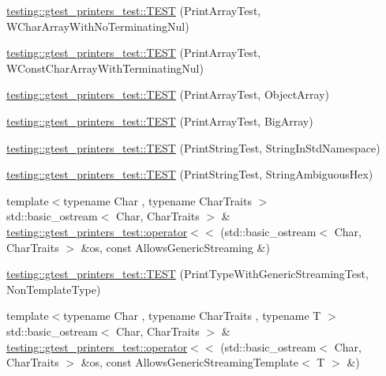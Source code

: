 \begin{DoxyCompactItemize}
\item 
\hyperlink{namespacetesting_1_1gtest__printers__test_ac19ec2732031bfe83b30ea9f00259ef3}{testing\+::gtest\+\_\+printers\+\_\+test\+::\+T\+E\+S\+T} (Print\+Array\+Test, W\+Char\+Array\+With\+No\+Terminating\+Nul)
\item 
\hyperlink{namespacetesting_1_1gtest__printers__test_a6a7cbcdbe748a1d4e90658f48f36c9da}{testing\+::gtest\+\_\+printers\+\_\+test\+::\+T\+E\+S\+T} (Print\+Array\+Test, W\+Const\+Char\+Array\+With\+Terminating\+Nul)
\item 
\hyperlink{namespacetesting_1_1gtest__printers__test_af91d8ad9d6c7547913fe05c7acc44114}{testing\+::gtest\+\_\+printers\+\_\+test\+::\+T\+E\+S\+T} (Print\+Array\+Test, Object\+Array)
\item 
\hyperlink{namespacetesting_1_1gtest__printers__test_a596493b56489aa1571fa26d1402e7116}{testing\+::gtest\+\_\+printers\+\_\+test\+::\+T\+E\+S\+T} (Print\+Array\+Test, Big\+Array)
\item 
\hyperlink{namespacetesting_1_1gtest__printers__test_abbd355e76033f0defd76c37523ad0f60}{testing\+::gtest\+\_\+printers\+\_\+test\+::\+T\+E\+S\+T} (Print\+String\+Test, String\+In\+Std\+Namespace)
\item 
\hyperlink{namespacetesting_1_1gtest__printers__test_ac20ee165500471e363011c3f664d2fb8}{testing\+::gtest\+\_\+printers\+\_\+test\+::\+T\+E\+S\+T} (Print\+String\+Test, String\+Ambiguous\+Hex)
\item 
{\footnotesize template$<$typename Char , typename Char\+Traits $>$ }\\std\+::basic\+\_\+ostream$<$ Char, Char\+Traits $>$ \& \hyperlink{namespacetesting_1_1gtest__printers__test_a1eb0213095e639d357692066e8505887}{testing\+::gtest\+\_\+printers\+\_\+test\+::operator$<$$<$} (std\+::basic\+\_\+ostream$<$ Char, Char\+Traits $>$ \&os, const Allows\+Generic\+Streaming \&)
\item 
\hyperlink{namespacetesting_1_1gtest__printers__test_a9272037c799c4779e1d79476dad66cb6}{testing\+::gtest\+\_\+printers\+\_\+test\+::\+T\+E\+S\+T} (Print\+Type\+With\+Generic\+Streaming\+Test, Non\+Template\+Type)
\item 
{\footnotesize template$<$typename Char , typename Char\+Traits , typename T $>$ }\\std\+::basic\+\_\+ostream$<$ Char, Char\+Traits $>$ \& \hyperlink{namespacetesting_1_1gtest__printers__test_a5464168e925b1adf29986c8e544e908e}{testing\+::gtest\+\_\+printers\+\_\+test\+::operator$<$$<$} (std\+::basic\+\_\+ostream$<$ Char, Char\+Traits $>$ \&os, const Allows\+Generic\+Streaming\+Template$<$ T $>$ \&)

\end{DoxyCompactItemize}
